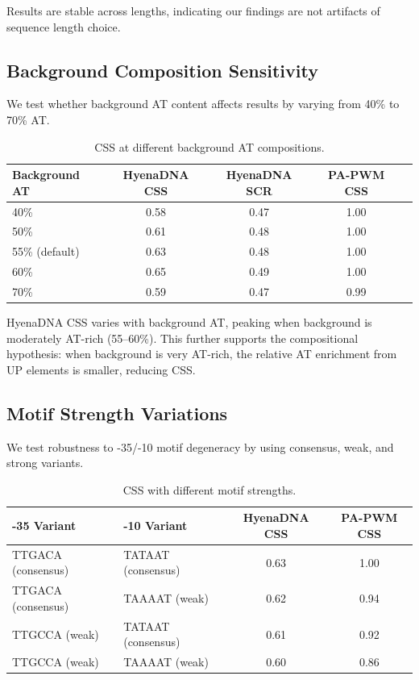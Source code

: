 \documentclass{article}
\begin{document}
Results are stable across lengths, indicating our findings are not artifacts of sequence length choice.

\subsection{Background Composition Sensitivity}

We test whether background AT content affects results by varying from 40\% to 70\% AT.

\begin{table}[H]
\caption{CSS at different background AT compositions.}
\begin{center}
\small
\begin{tabular}{lcccc}
\toprule
Background AT & HyenaDNA CSS & HyenaDNA SCR & PA-PWM CSS \\
\midrule
40\% & 0.58 & 0.47 & 1.00 \\
50\% & 0.61 & 0.48 & 1.00 \\
55\% (default) & 0.63 & 0.48 & 1.00 \\
60\% & 0.65 & 0.49 & 1.00 \\
70\% & 0.59 & 0.47 & 0.99 \\
\bottomrule
\end{tabular}
\end{center}
\end{table}

HyenaDNA CSS varies with background AT, peaking when background is moderately AT-rich (55--60\%). This further supports the compositional hypothesis: when background is very AT-rich, the relative AT enrichment from UP elements is smaller, reducing CSS.

\subsection{Motif Strength Variations}

We test robustness to -35/-10 motif degeneracy by using consensus, weak, and strong variants.

\begin{table}[H]
\caption{CSS with different motif strengths.}
\begin{center}
\small
\begin{tabular}{llcc}
\toprule
-35 Variant & -10 Variant & HyenaDNA CSS & PA-PWM CSS \\
\midrule
TTGACA (consensus) & TATAAT (consensus) & 0.63 & 1.00 \\
TTGACA (consensus) & TAAAAT (weak) & 0.62 & 0.94 \\
TTGCCA (weak) & TATAAT (consensus) & 0.61 & 0.92 \\
TTGCCA (weak) & TAAAAT (weak) & 0.60 & 0.86 \\
\bottomrule
\end{tabular}
\end{center}
\end{table}
\end{document}

